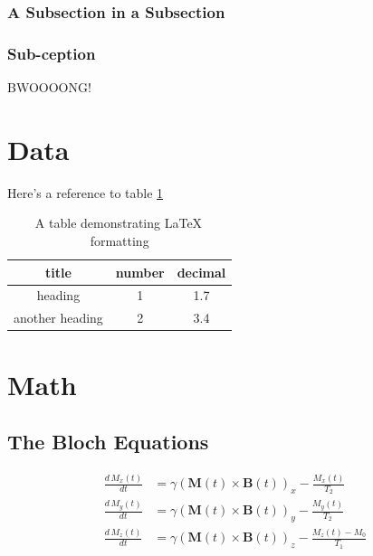 \documentclass{workreport}
\begin{document}
\begin{body}
\subsubsection{A Subsection in a Subsection}

	\lipsum[1]

\subsubsection{Sub-ception}

	\lipsum[1]

	BWOOOONG!

\section{Data}

	\lipsum[1-2]

Here's a reference to table \ref{tbl:exampletable}

\begin{table}
	\centering
	\begin{tabular}{|c|c|c|} \hline
		title & number & decimal \\ \hline
		heading & 1 & 1.7 \\ \hline
		another heading & 2 & 3.4 \\ \hline
	\end{tabular}
	\caption{A table demonstrating \LaTeX \, formatting}
	\label{tbl:exampletable}
\end{table}

\section{Math}

\lipsum[1]

\subsection{The Bloch Equations}

	\begin{align}
		\frac{d\, M_x(t)}{dt} &= \gamma(\mathbf{M}(t) \times \mathbf{B}(t))_x - \frac{M_x(t)}{T_2} \\
		\frac{d\, M_y(t)}{dt} &= \gamma(\mathbf{M}(t) \times \mathbf{B}(t))_y - \frac{M_y(t)}{T_2} \\
		\frac{d\, M_z(t)}{dt} &= \gamma(\mathbf{M}(t) \times \mathbf{B}(t))_z - \frac{M_z(t) - M_0}{T_1}
	\end{align}


\end{body}
\end{document}
